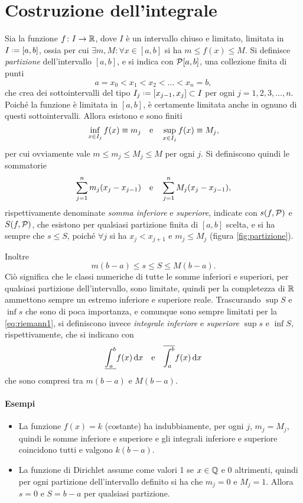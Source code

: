 \section{Costruzione dell'integrale}
Sia la funzione $f\colon I\to\mathbb{R}$, dove $I$ è un intervallo chiuso e limitato, limitata in $I\defeq[a,b]$, ossia per cui $\exists m,M\colon\forall x\in [a,b]$ si ha $m\leq f(x)\leq M$.
Si definisce \emph{partizione} dell'intervallo $[a,b]$, e si indica con $\mathcal{P}[a,b]$, una collezione finita di punti
\[
a=x_0<x_1<x_2<\dots<x_n=b,
\]
che crea dei sottointervalli del tipo $I_j\defeq[x_{j-1},x_j]\subset I$ per ogni $j=1,2,3,\dots,n$. Poiché la funzione è limitata in $[a,b]$, è certamente limitata anche in ognuno di questi sottointervalli. Allora esistono e sono finiti
\[
\inf_{x\in I_j}f(x)\equiv m_j\quad\text{e}\quad\sup_{x\in I_j}f(x)\equiv M_j,
\]
per cui ovviamente vale $m\leq m_j\leq M_j\leq M$ per ogni $j$.
Si definiscono quindi le sommatorie
\[
\sum_{j=1}^nm_j(x_j-x_{j-1})\quad\text{e}\quad\sum_{j=1}^nM_j(x_j-x_{j-1}),
\]
rispettivamente denominate \emph{somma inferiore} e \emph{superiore}, indicate con $s(f,\mathcal{P})$ e $S(f,\mathcal{P})$, che esistono per qualsiasi partizione finita di $[a,b]$ scelta, e si ha sempre che $s\leq S$, poiché $\forall j$ si ha $x_j<x_{j+1}$ e $m_j\leq M_j$ (figura \ref{fig:partizione}).

Inoltre
\begin{equation} \label{eq:riemann1}
m(b-a)\leq s\leq S\leq M(b-a).
\end{equation}
Ciò significa che le classi numeriche di tutte le somme inferiori e superiori, per qualsiasi partizione dell'intervallo, sono limitate, quindi per la completezza di $\mathbb{R}$ ammettono sempre un estremo inferiore e superiore reale. Trascurando $\sup S$ e $\inf s$ che sono di poca importanza, e comunque sono sempre limitati per la \eqref{eq:riemann1}, si definiscono invece \emph{integrale inferiore} e \emph{superiore} $\sup s$ e $\inf S$, rispettivamente, che si indicano con
\[
\underline{\int_a^b} f(x)\,\textup{d} x\quad\text{e}\quad\overline{\int_a^b} f(x)\,\textup{d} x
\]
che sono compresi tra $m(b-a)$ e $M(b-a)$.

\paragraph{Esempi}
\begin{itemize}
\item La funzione $f(x)=k$ (costante) ha indubbiamente, per ogni $j$, $m_j=M_j$, quindi le somme inferiore e superiore e gli integrali inferiore e superiore coincidono tutti e valgono $k(b-a)$.
\item La funzione di Dirichlet assume come valori 1 se $x\in\mathbb{Q}$ e 0 altrimenti, quindi per ogni partizione dell'intervallo definito si ha che $m_j=0$ e $M_j=1$. Allora $s=0$ e $S=b-a$ per qualsiasi partizione.
\end{itemize}

